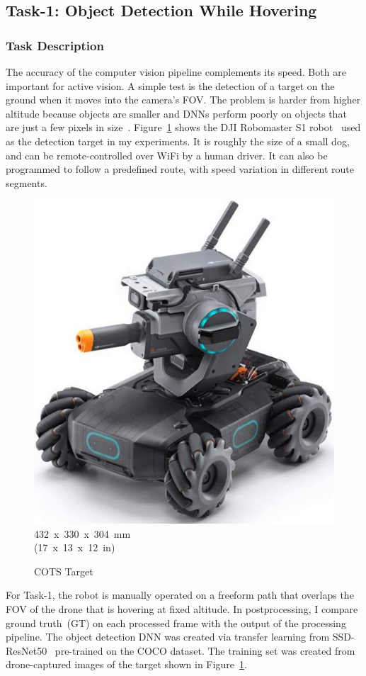 \subsection{Task-1: Object Detection While Hovering}
\label{sec:task1}

\subsubsection{Task Description}
\label{sec:task1-desc}

The accuracy of the computer vision pipeline complements its speed.
\begingroup
\setlength{\columnsep}{4pt}
Both are important for active vision.  A simple test is the detection
of a target on the ground when it moves into the camera's FOV.  The
problem is harder from higher altitude because objects are smaller and
DNNs perform poorly on objects that are just a few pixels in
size~\cite{Huang2017}.
Figure~\ref{fig:robomaster} shows the DJI Robomaster S1
robot~\cite{Robomaster2022} used as the detection target in my
experiments.  It is roughly the size of a small dog, and can be
remote-controlled over WiFi by a human driver.  It can also be
programmed to follow a predefined route, with speed variation in
different route segments. 

\begin{figure}
\centering
\includegraphics[width=0.2\linewidth]{chapter4/FIGS/robomaster.jpg}\\
{\footnotesize 432~x~330~x~304~mm\\[-0.05in]
\noindent(17~x~13~x~12~in)}
\caption{COTS Target}
\label{fig:robomaster}
\end{figure}

For Task-1, the robot is manually operated
on a freeform path that overlaps the FOV of the drone that is hovering
at fixed altitude.  In postprocessing, I compare ground truth~(GT) on
each processed frame with the output of the processing pipeline.  The
object detection DNN was created via transfer learning from
SSD-ResNet50~\cite{SSDResnet50} pre-trained on the COCO dataset.  The
training set was created from drone-captured images of the target
shown in Figure~\ref{fig:robomaster}.

\endgroup


